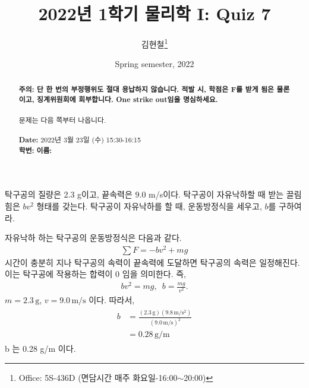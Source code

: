 \documentclass[floatfix,nofootinbib,superscriptaddress,fleqn,preprint]{revtex4}
\begin{document}
\title{\Large 2022년 1학기 물리학 I: Quiz 7}
\author{김현철\footnote{Office: 5S-436D (면담시간 매주
    화요일-16:00$\sim$20:00)}} 
\date{Spring semester, 2022}


\vspace{1.cm}
\begin{abstract}
\noindent \textbf{ {\color{red}주의}: \color{blue} 단 한 번의 부정행위도 절대
  용납하지 않습니다. 적발 시, 학점은 F를 받게 됨은 물론이고,
  징계위원회에 회부합니다. One strike out임을 명심하세요.}\\
\\
문제는 다음 쪽부터 나옵니다.  \\ \\
{\bf Date:} 2022년 3월 23일 (수) 15:30-16:15 
\\
{\bf 학번:} \hspace{4cm}
{\bf 이름:} 

\end{abstract}
\maketitle

탁구공의 질량은 2.3 g이고, 끝속력은 $9.0$ m/s이다. 탁구공이 자유낙하할
때 받는 끌림힘은 $bv^2$ 형태를 갖는다. 탁구공이 자유낙하를 할 때,
운동방정식을 세우고, $b$를 구하여라.  


자유낙하 하는 탁구공의 운동방정식은 다음과 같다.
\begin{align}
  \sum F = -bv^2+mg
\end{align}
시간이 충분히 지나 탁구공의 속력이 끝속력에 도달하면 탁구공의 속력은 
일정해진다. 이는 탁구공에 작용하는 합력이 0 임을 의미한다. 즉,
\begin{align}
  bv^2 = mg,\,\,\, b =\frac{mg}{v^2}.
\end{align}
$m = 2.3\,\mathrm{g}$, $v = 9.0\,\mathrm{m/s}$ 이다. 따라서,
\begin{align}
  \begin{split}
    b &= \frac{(2.3\,\mathrm{g})(9.8\,\mathrm{m/s^2})}{( 9.0\,\mathrm{m/s})^2}  \\
    &= 0.28\,\mathrm{g/m}
  \end{split}
  \end{align}
  b 는 0.28 g/m 이다.
\vspace{1.cm}
\end{document}
